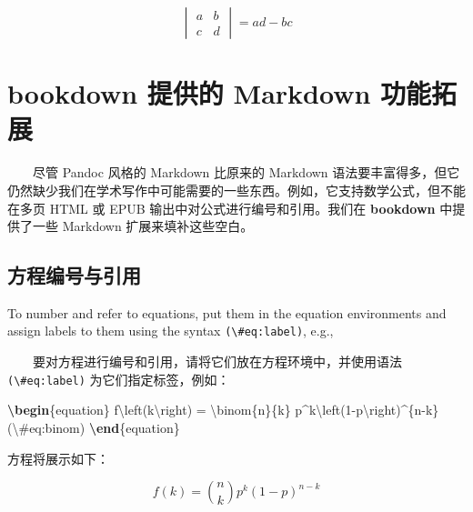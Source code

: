 \documentclass[
  12pt,
]{krantz}
\newenvironment{Shaded}{\begin{snugshade}}{\end{snugshade}}
\newcommand{\ExtensionTok}[1]{#1}
\newcommand{\KeywordTok}[1]{\textcolor[rgb]{0.13,0.29,0.53}{\textbf{#1}}}
\newcommand{\NormalTok}[1]{#1}
\newcommand{\SpecialCharTok}[1]{\textcolor[rgb]{0.00,0.00,0.00}{#1}}
\newcommand{\SpecialStringTok}[1]{\textcolor[rgb]{0.31,0.60,0.02}{#1}}
\theoremstyle{definition}
\theoremstyle{definition}
\theoremstyle{definition}
\theoremstyle{definition}
\theoremstyle{remark}
\begin{document}
\[\begin{vmatrix}a & b\\
c & d
\end{vmatrix}=ad-bc\]

\hypertarget{bookdown-ux63d0ux4f9bux7684-markdown-ux529fux80fdux62d3ux5c55}{%
\section{bookdown 提供的 Markdown 功能拓展}\label{bookdown-ux63d0ux4f9bux7684-markdown-ux529fux80fdux62d3ux5c55}}

  尽管 Pandoc 风格的 Markdown 比原来的 Markdown 语法要丰富得多，但它仍然缺少我们在学术写作中可能需要的一些东西。例如，它支持数学公式，但不能在多页 HTML 或 EPUB 输出中对公式进行编号和引用。我们在 \textbf{bookdown} 中提供了一些 Markdown 扩展来填补这些空白。

\hypertarget{equations}{%
\subsection{方程编号与引用}\label{equations}}

To number and refer to equations, put them in the equation environments and assign labels to them using the syntax \texttt{(\textbackslash{}\#eq:label)}, e.g.,

  要对方程进行编号和引用，请将它们放在方程环境中，并使用语法 \texttt{(\textbackslash{}\#eq:label)} 为它们指定标签，例如：

\begin{Shaded}
\begin{Highlighting}[]
\KeywordTok{\textbackslash{}begin}\NormalTok{\{}\ExtensionTok{equation}\NormalTok{\}}\SpecialStringTok{ }
\SpecialStringTok{  f}\SpecialCharTok{\textbackslash{}left}\SpecialStringTok{(k}\SpecialCharTok{\textbackslash{}right}\SpecialStringTok{) = }\SpecialCharTok{\textbackslash{}binom}\SpecialStringTok{\{n\}\{k\} p\^{}k}\SpecialCharTok{\textbackslash{}left}\SpecialStringTok{(1{-}p}\SpecialCharTok{\textbackslash{}right}\SpecialStringTok{)\^{}\{n{-}k\}}
\SpecialStringTok{  (}\SpecialCharTok{\textbackslash{}\#}\SpecialStringTok{eq:binom)}
\KeywordTok{\textbackslash{}end}\NormalTok{\{}\ExtensionTok{equation}\NormalTok{\} }
\end{Highlighting}
\end{Shaded}

方程将展示如下：

\begin{equation}
f\left(k\right)=\binom{n}{k}p^k\left(1-p\right)^{n-k} \label{eq:binom}
\end{equation}
\end{document}
